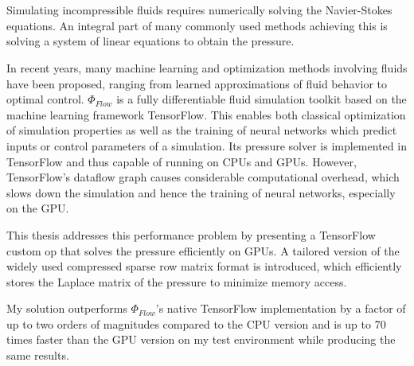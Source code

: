 \chapter{\abstractname}
Simulating incompressible fluids requires numerically solving the Navier-Stokes equations. An integral part of many commonly used methods achieving this is solving a system of linear equations to obtain the pressure. 
\par In recent years, many machine learning and optimization methods involving fluids have been proposed, ranging from learned approximations of fluid behavior to optimal control. $\Phi_{Flow}$ is a fully differentiable fluid simulation toolkit based on the machine learning framework TensorFlow. This enables both classical optimization of simulation properties as well as the training of neural networks which predict inputs or control parameters of a simulation. Its pressure solver is implemented in TensorFlow and thus capable of running on CPUs and GPUs. However, TensorFlow's dataflow graph causes considerable computational overhead, which slows down the simulation and hence the training of neural networks, especially on the GPU. 
\par This thesis addresses this performance problem by presenting a TensorFlow custom op that solves the pressure efficiently on GPUs. A tailored version of the widely used compressed sparse row matrix format is introduced, which efficiently stores the Laplace matrix of the pressure to minimize memory access. 
\par My solution outperforms $\Phi_{Flow}$'s native TensorFlow implementation by a factor of up to two orders of magnitudes compared to the CPU version and is up to 70 times faster than the GPU version on my test environment while producing the same results.